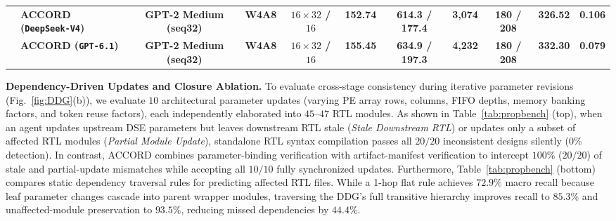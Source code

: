 \documentclass[9pt,conference]{IEEEtran}
\begin{document}
\begin{table}[t]
{\begin{tabular}{|l|l|c|c|c|c|c|c|c|c|c|}
\cline{2-11}
 & \textbf{ACCORD (\texttt{DeepSeek-V4})} & \textbf{GPT-2 Medium (seq32)} & \textbf{W4A8} & \textbf{$16\times 32$ / $16$} & \textbf{152.74} & \textbf{614.3 / 177.4} & \textbf{3,074} & \textbf{180 / 208} & \textbf{326.52} & \textbf{0.106} \\
\cline{2-11}
 & \textbf{ACCORD (\texttt{GPT-6.1})} & \textbf{GPT-2 Medium (seq32)} & \textbf{W4A8} & \textbf{$16\times 32$ / $16$} & \textbf{155.45} & \textbf{634.9 / 197.3} & \textbf{4,232} & \textbf{180 / 208} & \textbf{332.30} & \textbf{0.079} \\
\hline
\end{tabular}%
}
\vspace{-6pt}
\end{table}

\textbf{Dependency-Driven Updates and Closure Ablation.}
To evaluate cross-stage consistency during iterative parameter revisions (Fig.~\ref{fig:DDG}(b)), we evaluate $10$ architectural parameter updates (varying PE array rows, columns, FIFO depths, memory banking factors, and token reuse factors), each independently elaborated into $45\text{--}47$ RTL modules. As shown in Table~\ref{tab:propbench} (top), when an agent updates upstream DSE parameters but leaves downstream RTL stale (\emph{Stale Downstream RTL}) or updates only a subset of affected RTL modules (\emph{Partial Module Update}), standalone RTL syntax compilation passes all $20/20$ inconsistent designs silently ($0\%$ detection). In contrast, ACCORD combines parameter-binding verification with artifact-manifest verification to intercept $100\%$ ($20/20$) of stale and partial-update mismatches while accepting all $10/10$ fully synchronized updates.
Furthermore, Table~\ref{tab:propbench} (bottom) compares static dependency traversal rules for predicting affected RTL files. While a 1-hop flat rule achieves $72.9\%$ macro recall because leaf parameter changes cascade into parent wrapper modules, traversing the DDG's full transitive hierarchy improves recall to $85.3\%$ and unaffected-module preservation to $93.5\%$, reducing missed dependencies by $44.4\%$.
\end{document}
